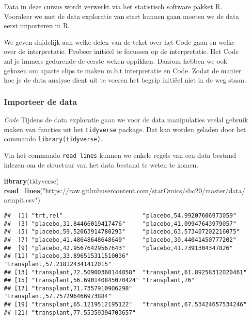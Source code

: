 \documentclass[
  12pt,dutch,coursenotes]{book}
\newenvironment{Shaded}{\begin{snugshade}}{\end{snugshade}}
\newcommand{\KeywordTok}[1]{\textcolor[rgb]{0.13,0.29,0.53}{\textbf{#1}}}
\newcommand{\NormalTok}[1]{#1}
\newcommand{\StringTok}[1]{\textcolor[rgb]{0.31,0.60,0.02}{#1}}
\theoremstyle{definition}
\theoremstyle{definition}
\theoremstyle{definition}
\theoremstyle{remark}
\begin{document}
Data in deze cursus wordt verwerkt via het statistisch software pakket R.
Vooraleer we met de data exploratie van start kunnen gaan moeten we de data eerst importeren in R.

We geven duidelijk aan welke delen van de tekst over het Code gaan en welke over de interpretatie. Probeer initiëel te focussen op de interpretatie. Het Code zal je immers gedurende de eerste weken oppikken. Daarom hebben we ook gekozen om aparte clips te maken m.b.t interpretatie en Code. Zodat de manier hoe je de data analyse dient uit te voeren het begrip initiëel niet in de weg staan.

\hypertarget{importeer-de-data}{%
\subsubsection{Importeer de data}\label{importeer-de-data}}

\emph{Code} Tijdens de data exploratie gaan we voor de data manipulaties veelal gebruik maken van functies uit het \texttt{tidyverse} package.
Dat kan worden geladen door het commando
\texttt{library(tidyverse)}.

Via het commando \texttt{read\_lines} kunnen we enkele regels van een data bestand inlezen om de structuur van het data bestand te weten te komen.

\begin{Shaded}
\begin{Highlighting}[]
\KeywordTok{library}\NormalTok{(tidyverse)}
\KeywordTok{read\_lines}\NormalTok{(}\StringTok{"https://raw.githubusercontent.com/statOmics/sbc20/master/data/armpit.csv"}\NormalTok{)}
\end{Highlighting}
\end{Shaded}

\begin{verbatim}
##  [1] "trt,rel"                       "placebo,54.99207606973059"    
##  [3] "placebo,31.84466019417476"     "placebo,41.09947643979057"    
##  [5] "placebo,59.52063914780293"     "placebo,63.573407202216075"   
##  [7] "placebo,41.48648648648649"     "placebo,30.44041450777202"    
##  [9] "placebo,42.95676429567643"     "placebo,41.7391304347826"     
## [11] "placebo,33.896515311510036"    "transplant,57.218124341412015"
## [13] "transplant,72.50900360144058"  "transplant,61.89258312020461" 
## [15] "transplant,56.690140845070424" "transplant,76"                
## [17] "transplant,71.7357910906298"   "transplant,57.757296466973884"
## [19] "transplant,65.1219512195122"   "transplant,67.53424657534246" 
## [21] "transplant,77.55359394703657"
\end{verbatim}
\end{document}
